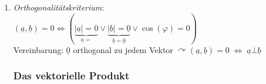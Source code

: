 \begin{enumerate}
\begin{enumerate} [label=\alph*.)]
$\varphi=arccos\left(\frac{29}{\sqrt{14} \cdot \sqrt{65}}\right)\approx 15,92^{\circ}$
\item Projektion von $\underline{b}$ auf $\underline{a}$: $\underline{b}\underline{a}=\frac{(\underline{a}, \underline{b})}{|\underline{a}|^2}\underline{a}=\frac{29}{14}\begin{pmatrix}
1\\
-2\\
3
\end{pmatrix}=\frac{29}{14}\underline{e}_1-\frac{29}{7}\underline{e}_2+\frac{29\cdot 3}{14} \underline{e}_3$
\end{enumerate}
\item \emph{Orthogonalitätskriterium}:\\
$(\underline{a}, \underline{b})=0 \Leftrightarrow (\underbrace{|\underline{a}|=0}_{\underline{a}=} \vee \underbrace{|\underline{b}|=\underline{0}}_{\underline{b}=\underline{0}} \vee \cos(\varphi)=0)$\\
Vereinbarung: $\underline{0}$ orthogonal zu jedem Vektor
$\curvearrowright \boxed{(\underline{a}, \underline{b})=0 \;\Leftrightarrow\; \underline{a} \bot \underline{b}}$

\subsubsection{Das vektorielle Produkt}

\end{enumerate}
